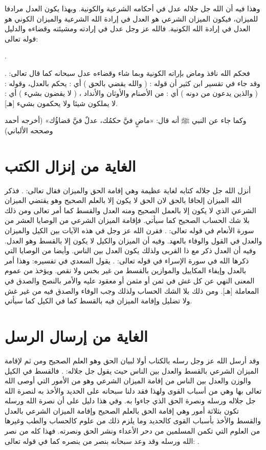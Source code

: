 وهذا فيه أن الله جل جلاله عدل في أحكامه الشرعية والكونية. وبهذا يكون العدل مرادفا للميزان، فيكون الميزان الشرعي هو العدل في إرادة الله الشرعية والميزان الكوني هو العدل في إرادة الله الكونية. فالله عز وجل عدل في إرادته ومشيئته وقضاءه والدليل قوله تعالى:

\quranayah*[3][108]{\footnotesize \surahname*[3]}.

فحكم الله نافذ وماض بإراته الكونية وبما شاء وقضاءه عدل سبحانه كما قال تعالى:
\quranayah*[40][20]{\footnotesize \surahname*[40]}. وقد جاء في تقسير ابن كثير أن قوله : ( والله يقضي بالحق ) أي : يحكم بالعدل، وقوله : ( والذين يدعون من دونه ) أي : من الأصنام والأوثان والأنداد ، ( لا يقضون بشيء ) أي : لا يملكون شيئا ولا يحكمون بشيء [هـ].

وكما جاء عن النبي ﷺ أنه قال:
«ماضٍ فيَّ حكمُك، عدلٌ فيَّ قضاؤُك» {\footnotesize (أخرجه أحمد وصححه الألباني)}


\section{الغاية من إنزال الكتب}

أنزل الله جل جلاله كتابه لغاية عظيمة وهي إقامة الحق والميزان فقال تعالى:
\quranayah*[42][17]{\footnotesize \surahname*[42]}.
فذكر الله الميزان إلحاقا بالحق لان الحق لا يكون إلا بالعلم الصحيح وهو يقتضي الميزان الشرعي الذي لا يكون إلا بالعمل الصحيح ومنه العدل والقسط كما أمر تعالى ومن ذلك بلا شك الحساب الصحيح كما سيأتي. فإقامة الميزان الشرعي من الوصايا العشر من سورة الأنعام في قوله تعالى:
\quranayah*[6][152][12]{\footnotesize \surahname*[6]}. فقرن الله عز وجل في هذه الآيات بين الكيل والميزان والعدل في القول والوفاء بالعهد. وفيه أن الميزان والكيل لا يكون إلا بالقسط وهو العدل. وفيه أن العدل ذكر مع ذا القربى ولذلك يكون العدل بين الناس.
وأيضا من الوصايا التي ذكرها الله في سورة الإسراء في قوله تعالى:
\quranayah*[17][35]{\footnotesize \surahname*[17]}. يقول السعدي في تفسيره:
وهذا أمر بالعدل وإيفاء المكاييل والموازين بالقسط من غير بخس ولا نقص. ويؤخذ من عموم المعنى النهي عن كل غش في ثمن أو مثمن أو معقود عليه والأمر بالنصح والصدق في المعاملة [هـ]. ومن ذلك بلا الشك الحساب ولذلك وجب الوفاء والصدق فيه من غير غش ولا تضليل وإقامة الميزان فيه بالقسط كما في الكيل كما سيأتي.

\section{الغاية من إرسال الرسل}

وقد أرسل الله عز وجل رسله بالكتاب أولا لبيان الحق وهو العلم الصحيح ومن ثم لإقامة الميزان الشرعي بالقسط والعدل بين الناس حيث يقول جل جلاله:
\quranayah*[57][25]{\footnotesize \surahname*[57]}. فالقسط في الكيل والوزن والعدل بين الناس من إقامة الميزان الشرعي وهو من الأمور التي أوصى الله تعالى بها وهي من أسباب القوى ولهذا فقد دلنا سبحانه على الحديد والأخذ به لنصرة الله جل جلاله ورسله ونصرة الحق الذي جاءوا به. وفي هذا دليل على أن نصرة الله ورسله تكون بثلاثة أمور وهي إقامة الحق بالعلم الصحيح وإقامة الميزان الشرعي بالعدل والقسط والأخذ بأسباب القوى كالحديد وما يلزم ذلك من علوم كالحساب والطب وغيرها من العلوم التي تكمن المسلمين من دحر الأعداء ونشر الحق ونصرته. فهذا كله من نصر الله ورسله وقد وعد سبحانه بنصر من ينصره كما في قوله تعالى:
\quranayah*[47][7]{\footnotesize \surahname*[47]}.


